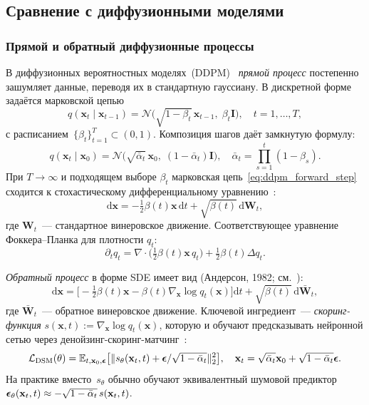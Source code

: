 \subsection{Сравнение с диффузионными моделями}
\label{sec:ddpm_comparison}

\subsubsection{Прямой и обратный диффузионные процессы}

В диффузионных вероятностных моделях~(DDPM)~\cite{ho2020denoising, sohl2015deep} \emph{прямой процесс} постепенно зашумляет данные, переводя их в стандартную гауссиану. В дискретной форме задаётся марковской цепью
\begin{equation}
    q(\mathbf{x}_t\mid\mathbf{x}_{t-1}) = \mathcal{N}\!\bigl(\sqrt{1-\beta_t}\,\mathbf{x}_{t-1},\;\beta_t\mathbf{I}\bigr), \quad t=1,\ldots,T,
    \label{eq:ddpm_forward_step}
\end{equation}
с расписанием~$\{\beta_t\}_{t=1}^T\subset(0,1)$. Композиция шагов даёт замкнутую формулу:
\begin{equation}
    q(\mathbf{x}_t\mid\mathbf{x}_0) = \mathcal{N}\!\bigl(\sqrt{\bar\alpha_t}\,\mathbf{x}_0,\;(1-\bar\alpha_t)\mathbf{I}\bigr), \quad \bar\alpha_t = \prod_{s=1}^t (1-\beta_s).
    \label{eq:ddpm_forward}
\end{equation}
При $T\to\infty$ и подходящем выборе $\beta_t$ марковская цепь~\eqref{eq:ddpm_forward_step} сходится к стохастическому дифференциальному уравнению~\cite{song2020score}:
\[
    \mathrm{d}\mathbf{x} = -\tfrac{1}{2}\beta(t)\mathbf{x}\,\mathrm{d}t + \sqrt{\beta(t)}\,\mathrm{d}\mathbf{W}_t,
\]
где $\mathbf{W}_t$~--- стандартное винеровское движение. Соответствующее уравнение Фоккера--Планка для плотности $q_t$:
\[
    \partial_t q_t = \nabla\!\cdot\!\bigl(\tfrac{1}{2}\beta(t)\mathbf{x}\,q_t\bigr) + \tfrac{1}{2}\beta(t)\Delta q_t.
\]

\emph{Обратный процесс} в форме SDE имеет вид (Андерсон, 1982; см.~\cite{song2020score}):
\begin{equation}
    \mathrm{d}\mathbf{x} = \bigl[-\tfrac{1}{2}\beta(t)\mathbf{x} - \beta(t)\nabla_{\mathbf{x}}\log q_t(\mathbf{x})\bigr]\mathrm{d}t + \sqrt{\beta(t)}\,\mathrm{d}\bar{\mathbf{W}}_t,
    \label{eq:reverse_sde}
\end{equation}
где $\bar{\mathbf{W}}_t$~--- обратное винеровское движение. Ключевой ингредиент~--- \emph{скоринг-функция} $s(\mathbf{x},t):=\nabla_{\mathbf{x}}\log q_t(\mathbf{x})$, которую и обучают предсказывать нейронной сетью через денойзинг-скоринг-матчинг~\cite{vincent2011connection, hyvarinen2005estimation}:
\begin{equation}
    \mathcal{L}_{\mathrm{DSM}}(\theta) = \mathbb{E}_{t,\mathbf{x}_0,\boldsymbol{\epsilon}}\bigl[\lVert s_\theta(\mathbf{x}_t,t)+\boldsymbol{\epsilon}/\sqrt{1-\bar\alpha_t}\rVert_2^2\bigr], \quad \mathbf{x}_t=\sqrt{\bar\alpha_t}\mathbf{x}_0+\sqrt{1-\bar\alpha_t}\boldsymbol{\epsilon}.
    \label{eq:dsm}
\end{equation}
На практике вместо~$s_\theta$ обычно обучают эквивалентный шумовой предиктор $\boldsymbol{\epsilon}_\theta(\mathbf{x}_t,t)\approx -\sqrt{1-\bar\alpha_t}\,s(\mathbf{x}_t,t)$.

